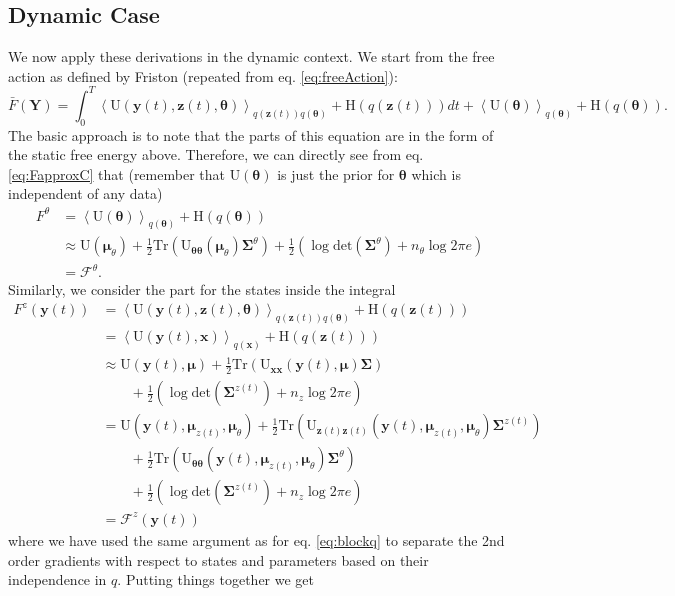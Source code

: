\documentclass[a4paper,10pt]{article}
\newcommand{\bs}[1]{\mathbf{#1}}					%
\newcommand{\bgs}[1]{\boldsymbol{#1}}				%
\newcommand{\trace}[1]{\mathrm{Tr}\left(#1\right)}					%
\renewcommand{\ss}{z}         %
\newcommand{\so}{y}         %
\newcommand{\sh}{x}         %
\renewcommand{\sp}{\theta}    %
\newcommand{\ps}{\bs{\ss}}    %
\newcommand{\po}{\bs{\so}}    %
\newcommand{\ph}{\bs{\sh}}    %
\newcommand{\pp}{\bgs{\sp}} %
\newcommand{\Po}{\bs{Y}}    %
\newcommand{\E}[2][]{\left\langle #2 \right\rangle_{#1}}	%
\newcommand{\Ent}{\mathrm{H}}			%
\newcommand{\U}{\mathrm{U}}			%
\newcommand{\F}{\mathcal{F}}				%
\newcommand{\Cov}{\bgs{\Sigma}}			%
\renewcommand{\det}[1]{\mathrm{det}(#1)}	%
\begin{document}
\subsection{Dynamic Case}
We now apply these derivations in the dynamic context. We start from the free action as defined by Friston (repeated from eq. \eqref{eq:freeAction}):
\[
    \bar{F}(\Po) = \int_0^T \E[q(\ps(t))q(\pp)]{\U(\po(t),\ps(t),\pp)} + \Ent(q(\ps(t))) dt + \E[q(\pp)]{\U(\pp)} + \Ent(q(\pp)).
\]
The basic approach is to note that the parts of this equation are in the form of the static free energy above. Therefore, we can directly see from eq. \eqref{eq:FapproxC} that (remember that $\U(\pp)$ is just the prior for $\pp$ which is independent of any data)
\begin{align}
    F^\sp &= \E[q(\pp)]{\U(\pp)} + \Ent(q(\pp))\\
    &\approx \U(\bgs{\mu}_\sp) + \frac{1}{2}\trace{\U_{\pp\pp}(\bgs{\mu}_\sp)\Cov^\sp} + \frac{1}{2} \left(\log \det{\Cov^\sp} + n_{\sp} \log 2\pi e\right)\\
    &= \F^\sp.
\end{align}
Similarly, we consider the part for the states inside the integral
\begin{align}
    F^\ss(\po(t)) &= \E[q(\ps(t))q(\pp)]{\U(\po(t),\ps(t),\pp)} + \Ent(q(\ps(t)))\\
    &= \E[q(\ph)]{\U(\po(t),\ph)} + \Ent(q(\ps(t)))\\
    &\approx \U(\po(t),\bgs{\mu}) + \frac{1}{2}\trace{\U_{\ph\ph}(\po(t),\bgs{\mu})\Cov} \nonumber\\
    &\qquad + \frac{1}{2} \left(\log \det{\Cov^{\ss(t)}} + n_{\ss} \log 2\pi e\right)\\
    &= \label{eq:stateFreeAction} \U(\po(t),\bgs{\mu}_{\ss(t)},\bgs{\mu}_\sp) + \frac{1}{2}\trace{\U_{\ps(t)\ps(t)}(\po(t),\bgs{\mu}_{\ss(t)},\bgs{\mu}_\sp)\Cov^{\ss(t)}}\nonumber\\
    &\qquad + \frac{1}{2}\trace{\U_{\pp\pp}(\po(t),\bgs{\mu}_{\ss(t)},\bgs{\mu}_\sp)\Cov^\sp}\nonumber\\ 
    &\qquad + \frac{1}{2} \left(\log \det{\Cov^{\ss(t)}} + n_{\ss} \log 2\pi e\right)\\
    &= \F^\ss(\po(t))
\end{align}
where we have used the same argument as for eq. \eqref{eq:blockq} to separate the 2nd order gradients with respect to states and parameters based on their independence in $q$. Putting things together we get
\end{document}
